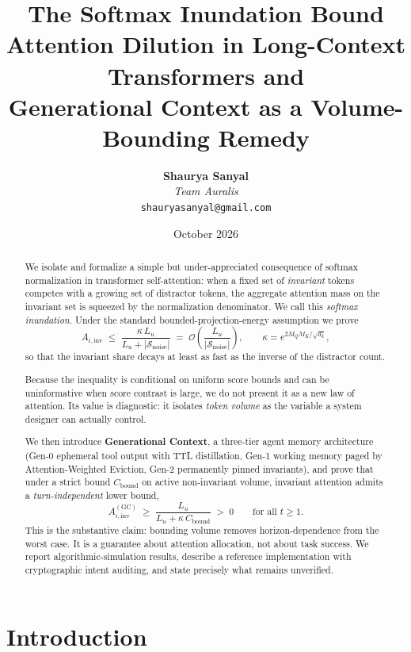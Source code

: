 ﻿\documentclass[11pt,a4paper]{article}
\title{%
  \textbf{The Softmax Inundation Bound}\\[0.4em]
  \large Attention Dilution in Long-Context Transformers and\\
  Generational Context as a Volume-Bounding Remedy
}
\author{%
  \textbf{Shaurya Sanyal}\\
  \textit{Team Auralis}\\
  \texttt{shauryasanyal@gmail.com}
}
\date{October 2026}
\theoremstyle{plain}
\theoremstyle{definition}
\theoremstyle{remark}
\begin{document}
\maketitle

\begin{abstract}
\noindent
We isolate and formalize a simple but under-appreciated consequence of softmax
normalization in transformer self-attention: when a fixed set of \emph{invariant}
tokens competes with a growing set of distractor tokens, the aggregate attention
mass on the invariant set is squeezed by the normalization denominator. We call
this \emph{softmax inundation}. Under the standard bounded-projection-energy
assumption we prove
\[
  A_{i,\mathrm{inv}} \;\le\; \frac{\kappa\, L_u}{L_u + |\mathcal{S}_{\mathrm{noise}}|}
  \;=\; \mathcal{O}\!\left(\frac{L_u}{|\mathcal{S}_{\mathrm{noise}}|}\right),
  \qquad \kappa = e^{2M_QM_K/\sqrt{d_k}},
\]
so that the invariant share decays at least as fast as the inverse of the
distractor count.

Because the inequality is conditional on uniform score bounds and can be
uninformative when score contrast is large, we do not present it as a new law of
attention. Its value is diagnostic: it isolates \emph{token volume} as the
variable a system designer can actually control.

We then introduce \textbf{Generational Context}, a three-tier agent memory
architecture (Gen-0 ephemeral tool output with TTL distillation, Gen-1 working
memory paged by Attention-Weighted Eviction, Gen-2 permanently pinned
invariants), and prove that under a strict bound $C_{\mathrm{bound}}$ on active
non-invariant volume, invariant attention admits a \emph{turn-independent}
lower bound,
\[
  A_{i,\mathrm{inv}}^{(\mathrm{GC})} \;\ge\;
  \frac{L_u}{L_u + \kappa\, C_{\mathrm{bound}}} \;>\; 0
  \qquad \text{for all } t \ge 1 .
\]
This is the substantive claim: bounding volume removes horizon-dependence from
the worst case. It is a guarantee about attention allocation, not about task
success. We report algorithmic-simulation results, describe a reference
implementation with cryptographic intent auditing, and state precisely what
remains unverified.
\end{abstract}

\section{Introduction}
\label{sec:intro}
\end{document}
